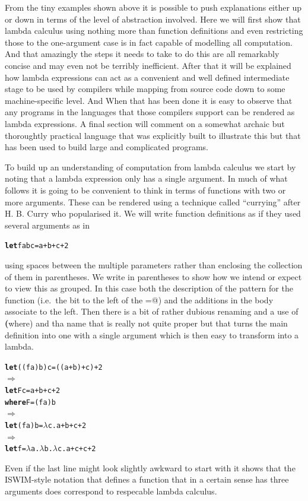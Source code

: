 From the tiny examples shown above it is possible to push explanations either
up or down in terms of the level of abstraction involved. Here we will first
show that lambda calculus using nothing more than function definitions and
even restricting those to the one-argument case is in fact capable of
modelling all computation. And that amazingly the steps it needs to take to
do this are all remarkably concise and may even not be terribly inefficient.
After that it will be explained how lambda expressions can act as a
convenient and well defined intermediate stage to be used by compilers while
mapping from source code down to some machine-specific level. And When that
has been done it is easy to observe that any programs in the languages that
those compilers support can be rendered as lambda expressions. A final
section will comment on a somewhat archaic but thoroughtly practical
language that was explicitly built to illustrate this but that has been
used to build large and complicated programs.

To build up an understanding of computation from lambda calculus we
start by noting that a lambda expression only has a single argument. In
much of what follows it is going to be convenient to think in terms of
functions with two or more arguments. These can be rendered using a
technique called ``currying'' after H. B. Curry\cite{curry} who popularised
it. We will write function definitions as if they used several arguments
as in
\begin{alltt}
   {\bf let} f a b c = a+b+c+2
\end{alltt}
using spaces between the multiple parameters rather than enclosing the
collection of them in parentheses.
We write in parentheses to show how we intend or expect to view this
as grouped. In this case both the description of the pattern for the
function (i.e.\ the bit to the left of the \verb@=@) and the additions in
the body associate to the left.
Then there is a bit of rather dubious renaming and a use of \textbf(where)
and tha name \verb@F@ that is really not quite proper but that turns the
main definition into one with a single argument which is then easy to
transform into a lambda.
\begin{alltt}
   {\bf let} ((f a) b) c = ((a+b)+c)+2
\(\Longrightarrow\)
   {\bf let} F c = a+b+c+2
   {\bf where} F = (f a) b
\(\Longrightarrow\)
   {\bf let} (f a) b = \(\lambda\) c . a+b+c+2
\(\Longrightarrow\)
   {\bf let} f = \(\lambda\) a . \(\lambda\) b . \(\lambda\) c . a+c+c+2
\end{alltt}
Even if the last line might look slightly awkward to start with it
shows that the ISWIM-style notation that defines a function that in a
certain sense has three arguments does correspond to respecable
lambda calculus.


